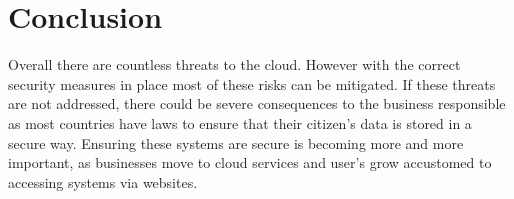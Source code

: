 \section{Conclusion}

Overall there are countless threats to the cloud. However with the correct security measures in place most of these risks can be mitigated.
If these threats are not addressed, there could be severe consequences to the business responsible as most countries have laws to ensure that their citizen's data is stored in a secure way. Ensuring these systems are secure is becoming more and more important, as businesses move to cloud services and user's grow accustomed to accessing systems via websites.
